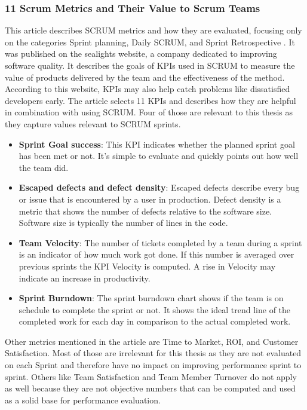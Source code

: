 \subsubsection*{11 Scrum Metrics and Their Value to Scrum Teams}
This article describes SCRUM metrics and how they are evaluated, 
focusing only on the categories Sprint planning, Daily SCRUM, 
and Sprint Retrospective \parencite{Sealights2023}. 
It was published on the sealights website, a company dedicated to improving software quality.
It describes the goals of KPIs used in SCRUM to measure the value of products 
delivered by the team and the effectiveness of the method. According to this website, 
KPIs may also help catch problems like dissatisfied developers early.
The article selects 11 KPIs and describes how they are helpful in combination with using SCRUM. 
Four of those are relevant to this thesis as they capture values relevant to SCRUM sprints.

\begin{itemize}
    \item \textbf{Sprint Goal success}:
    This KPI indicates whether the planned sprint goal has been met or not. It's simple to evaluate and quickly points out how well the team did.

    \item \textbf{Escaped defects and defect density}:
    Escaped defects describe every bug or issue that is encountered by a user in production. Defect density is a metric that shows the number of defects relative to the software size. Software size is typically the number of lines in the code.

    \item \textbf{Team Velocity}:
    The number of tickets completed by a team during a sprint is an indicator of how much work got done. If this number is averaged over previous sprints the KPI Velocity is computed. A rise in Velocity may indicate an increase in productivity.

    \item \textbf{Sprint Burndown}:
    The sprint burndown chart shows if the team is on schedule to complete the sprint or not. It shows the ideal trend line of the completed work for each day in comparison to the actual completed work.

\end{itemize}

Other metrics mentioned in the article are Time to Market, ROI, and Customer Satisfaction. Most of those are irrelevant for this thesis as they are not evaluated on each Sprint and therefore have no impact on improving performance sprint to sprint. Others like Team Satisfaction and Team Member Turnover do not apply as well because they are not objective numbers that can be computed and used as a solid base for performance evaluation.

